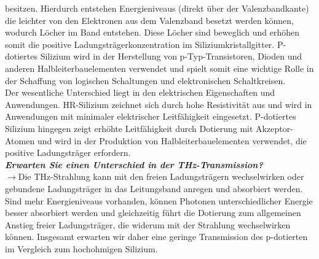 besitzen. Hierdurch entstehen Energieniveaus (direkt über der Valenzbandkante) 
die leichter von den Elektronen aus dem Valenzband besetzt werden können, wodurch Löcher im 
Band entstehen. Diese Löcher sind beweglich und erhöhen somit die positive 
Ladungsträgerkonzentration im Siliziumkristallgitter. 
P-dotiertes Silizium wird in der Herstellung von p-Typ-Transistoren, 
Dioden und anderen Halbleiterbauelementen verwendet und spielt somit 
eine wichtige Rolle in der Schaffung von logischen Schaltungen 
und elektronischen Schaltkreisen. \\
Der wesentliche Unterschied liegt in den elektrischen Eigenschaften und Anwendungen. 
HR-Silizium zeichnet sich durch hohe Resistivität aus und wird in Anwendungen mit minimaler 
elektrischer Leitfähigkeit eingesetzt. 
P-dotiertes Silizium hingegen zeigt erhöhte Leitfähigkeit durch Dotierung 
mit Akzeptor-Atomen und wird in der Produktion von Halbleiterbauelementen verwendet, 
die positive Ladungsträger erfordern. \\ 

\textbf{\textit{Erwarten Sie einen Unterschied in der THz-Transmission?}}\\
$\rightarrow$Die THz-Strahlung kann mit den freien Ladungsträgern wechselwirken oder
gebundene Ladungsträger in das Leitungsband anregen und absorbiert werden. 
Sind mehr Energieniveaus vorhanden, können Photonen unterschiedlicher Energie besser
absorbiert werden und gleichzeitig führt die Dotierung zum allgemeinen 
Anstieg freier Ladungsträger, die widerum mit der Strahlung wechselwirken können.
Insgesamt erwarten wir daher eine geringe Transmission des p-dotierten im
Vergleich zum hochohmigen Silizium. 